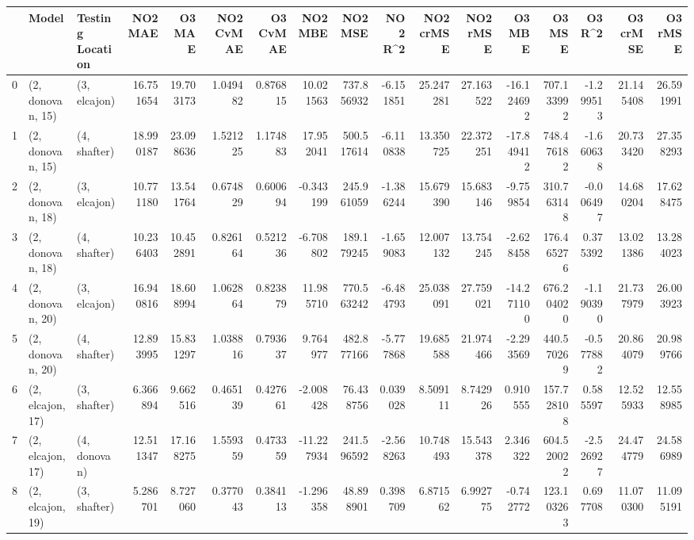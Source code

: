 \begin{tabular}{lllrrrrrrrrrrrrrr}
\toprule
{} &             Model & Testing Location &    NO2 MAE &     O3 MAE &  NO2 CvMAE &  O3 CvMAE &    NO2 MBE &      NO2 MSE &    NO2 R\textasciicircum2 &  NO2 crMSE &   NO2 rMSE &     O3 MBE &       O3 MSE &    O3 R\textasciicircum2 &   O3 crMSE &    O3 rMSE \\
\midrule
0  &  (2, donovan, 15) &     (3, elcajon) &  16.751654 &  19.703173 &   1.049482 &  0.876815 &  10.021563 &   737.856932 &  -6.151851 &  25.247281 &  27.163522 & -16.124692 &   707.133992 & -1.299513 &  21.145408 &  26.591991 \\
1  &  (2, donovan, 15) &     (4, shafter) &  18.990187 &  23.098636 &   1.521225 &  1.174883 &  17.952041 &   500.517614 &  -6.110838 &  13.350725 &  22.372251 & -17.849412 &   748.476182 & -1.660638 &  20.733420 &  27.358293 \\
2  &  (2, donovan, 18) &     (3, elcajon) &  10.771180 &  13.541764 &   0.674829 &  0.600694 &  -0.343199 &   245.961059 &  -1.386244 &  15.679390 &  15.683146 &  -9.759854 &   310.763148 & -0.006497 &  14.680204 &  17.628475 \\
3  &  (2, donovan, 18) &     (4, shafter) &  10.236403 &  10.452891 &   0.826164 &  0.521236 &  -6.708802 &   189.179245 &  -1.659083 &  12.007132 &  13.754245 &  -2.628458 &   176.465276 &  0.375392 &  13.021386 &  13.284023 \\
4  &  (2, donovan, 20) &     (3, elcajon) &  16.940816 &  18.608994 &   1.062864 &  0.823879 &  11.985710 &   770.563242 &  -6.484793 &  25.038091 &  27.759021 & -14.271100 &   676.204020 & -1.190390 &  21.737979 &  26.003923 \\
5  &  (2, donovan, 20) &     (4, shafter) &  12.893995 &  15.831297 &   1.038816 &  0.793637 &   9.764977 &   482.877166 &  -5.777868 &  19.685588 &  21.974466 &  -2.293569 &   440.570269 & -0.577882 &  20.864079 &  20.989766 \\
6  &  (2, elcajon, 17) &     (3, shafter) &   6.366894 &   9.662516 &   0.465139 &  0.427661 &  -2.008428 &    76.438756 &   0.039028 &   8.509111 &   8.742926 &   0.910555 &   157.728108 &  0.585597 &  12.525933 &  12.558985 \\
7  &  (2, elcajon, 17) &     (4, donovan) &  12.511347 &  17.168275 &   1.559359 &  0.473359 & -11.227934 &   241.596592 &  -2.568263 &  10.748493 &  15.543378 &   2.346322 &   604.520022 & -2.526927 &  24.474779 &  24.586989 \\
8  &  (2, elcajon, 19) &     (3, shafter) &   5.286701 &   8.727060 &   0.377043 &  0.384113 &  -1.296358 &    48.898901 &   0.398709 &   6.871562 &   6.992775 &  -0.742772 &   123.103263 &  0.697708 &  11.070300 &  11.095191 \\

\end{tabular}
